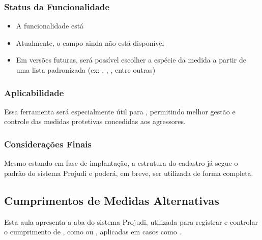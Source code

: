 \documentclass[letterpaper,10pt,brazil]{sphinxmanual}
\begin{document}
\subsubsection{Status da Funcionalidade}
\label{\detokenize{projud_57_medidaprotetivaagressor:status-da-funcionalidade}}\begin{itemize}
\item {} 
\sphinxAtStartPar
A funcionalidade está 

\item {} 
\sphinxAtStartPar
Atualmente, o campo  ainda não está disponível

\item {} 
\sphinxAtStartPar
Em versões futuras, será possível escolher a espécie da medida a partir de uma lista padronizada (ex: , , , entre outras)

\end{itemize}


\subsubsection{Aplicabilidade}
\label{\detokenize{projud_57_medidaprotetivaagressor:aplicabilidade}}
\sphinxAtStartPar
Essa ferramenta será especialmente útil para , permitindo melhor gestão e controle das medidas protetivas concedidas aos agressores.


\subsubsection{Considerações Finais}
\label{\detokenize{projud_57_medidaprotetivaagressor:consideracoes-finais}}
\sphinxAtStartPar
Mesmo estando em fase de implantação, a estrutura do cadastro já segue o padrão do sistema Projudi e poderá, em breve, ser utilizada de forma completa.

\sphinxstepscope


\subsection{Cumprimentos de Medidas Alternativas}
\label{\detokenize{projud_58_cadastrocumprimentomedida:cumprimentos-de-medidas-alternativas}}\label{\detokenize{projud_58_cadastrocumprimentomedida::doc}}
\sphinxAtStartPar
Esta aula apresenta a aba  do sistema Projudi, utilizada para registrar e controlar o cumprimento de , como  ou , aplicadas em casos como .
\end{document}
